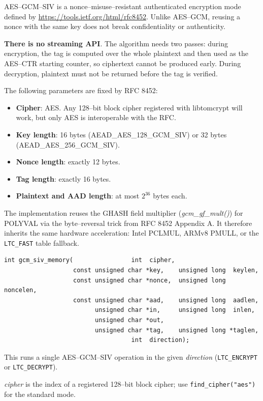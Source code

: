 \documentclass[synpaper]{book}
\begin{document}
AES--GCM--SIV is a nonce--misuse--resistant authenticated encryption mode defined by \url{https://tools.ietf.org/html/rfc8452}.
Unlike AES--GCM, reusing a nonce with the same key does not break confidentiality or authenticity.

\textbf{There is no streaming API}. The algorithm needs two passes: during encryption, the tag is computed over the whole plaintext
and then used as the AES--CTR starting counter, so ciphertext cannot be produced early. During decryption, plaintext must not be
returned before the tag is verified.

The following parameters are fixed by RFC 8452:
\begin{itemize}
   \item \textbf{Cipher}: AES. Any 128--bit block cipher registered with libtomcrypt will work, but only AES is interoperable with the RFC.
   \item \textbf{Key length}: 16 bytes (AEAD\_AES\_128\_GCM\_SIV) or 32 bytes (AEAD\_AES\_256\_GCM\_SIV).
   \item \textbf{Nonce length}: exactly 12 bytes.
   \item \textbf{Tag length}: exactly 16 bytes.
   \item \textbf{Plaintext and AAD length}: at most $2^{36}$ bytes each.
\end{itemize}

The implementation reuses the GHASH field multiplier (\textit{gcm\_gf\_mult()}) for POLYVAL via the byte--reversal trick from RFC 8452 Appendix A.
It therefore inherits the same hardware acceleration: Intel PCLMUL, ARMv8 PMULL, or the \texttt{LTC\_FAST} table fallback.

\begin{verbatim}
int gcm_siv_memory(                int  cipher,
                   const unsigned char *key,    unsigned long  keylen,
                   const unsigned char *nonce,  unsigned long  noncelen,
                   const unsigned char *aad,    unsigned long  aadlen,
                         unsigned char *in,     unsigned long  inlen,
                         unsigned char *out,
                         unsigned char *tag,    unsigned long *taglen,
                                   int  direction);
\end{verbatim}

This runs a single AES--GCM--SIV operation in the given \textit{direction} (\texttt{LTC\_ENCRYPT} or \texttt{LTC\_DECRYPT}).

\textit{cipher} is the index of a registered 128--bit block cipher; use \texttt{find\_cipher("aes")} for the standard mode.
\end{document}
